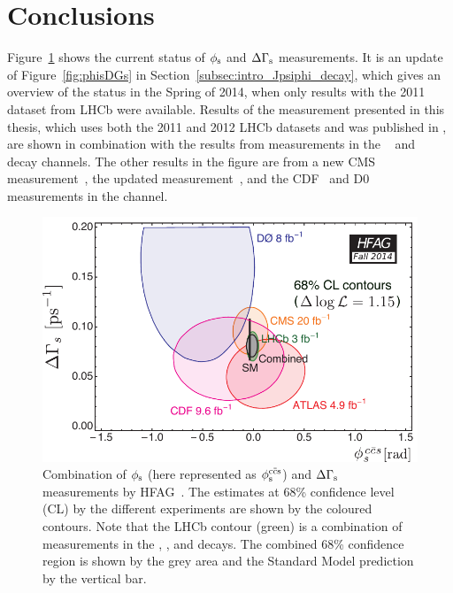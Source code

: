 \chapter*{Conclusions}
\chaptermark{}

Figure~\ref{fig:phisDGsNew} shows the current status of $\phi_\text{s}$ and $\Delta\Gamma_\text{s}$ measurements. It is an update of Figure~\ref{fig:phisDGs} in
Section~\ref{subsec:intro_Jpsiphi_decay}, which gives an overview of the status in the Spring of 2014, when only results with the 2011
dataset from LHCb were available. Results of the measurement presented in this thesis, which uses both the 2011 and 2012 LHCb datasets and
was published in \cite{LHCb-PAPER-2014-059}, are shown in combination with the results from measurements in the
\BstoJpsipipi~\cite{LHCb-PAPER-2014-019} and \BstoDspDsm~\cite{LHCb-PAPER-2014-051} decay channels. The other results in the figure are
from a new CMS measurement~\cite{CMS:2014jxa}, the updated \atlas{} measurement~\cite{Aad:2014cqa}, and the CDF~\cite{Aaltonen:2012ie} and
D0~\cite{Abazov:2011ry} measurements in the \BstoJpsiphi{} channel.
\begin{figure}[htb]
  \centering
  \includegraphics[width=\textwidth]{graphics/results/hfag_Fall2014_DGsphis-cmyk}
  \caption{Combination of $\phi_\text{s}$ (here represented as $\phisccs$) and $\Delta\Gamma_\text{s}$ measurements by HFAG~\cite{Amhis:2012bh}.
           The estimates at 68\% confidence level (CL) by the different experiments are shown by the coloured contours.
           Note that the LHCb contour (green) is a combination of measurements in the
           \BstoJpsiphi{}, \BstoJpsipipi{}, and \BstoDspDsm{} decays.
           The combined 68\% confidence region is shown by the grey area and the Standard Model prediction by the vertical bar.}
  \label{fig:phisDGsNew}
\end{figure}

